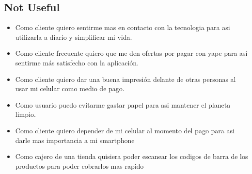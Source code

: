 \documentclass{article}
\begin{document}
\subsection{Not Useful}
\begin{itemize}
    \item Como cliente quiero sentirme mas en contacto con la tecnologia para asi utilizarla a diario y simplificar mi vida.
    \item Como cliente frecuente quiero que me den ofertas por pagar con yape para así sentirme más satisfecho con la aplicación.
    \item Como cliente quiero dar una buena impresión delante de otras personas al usar mi celular como medio de pago.
    \item Como usuario puedo evitarme gastar papel para asi mantener el planeta limpio.
    \item Como cliente quiero depender de mi celular al momento del pago para asi darle mas importancia a mi smartphone
    \item Como cajero de una tienda quisiera poder escanear los codigos de barra de los productos para poder cobrarlos mas rapido







\end{itemize}
\end{document}

